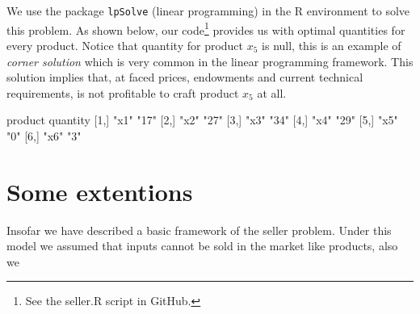 \documentclass[12pt]{article}         %
\begin{document}
We use the package \texttt{lpSolve} (linear programming) in the R environment to solve this problem. As shown below, our code\footnote{See the seller.R script in GitHub.} provides us with optimal quantities for every product. Notice that quantity for product $x_5$ is null, this is an example of \textit{corner solution} which is very common in the linear programming framework. This solution implies that, at faced prices, endowments and current technical requirements, is not profitable to craft product $x_5$ at all. 
\begin{Schunk}
\begin{Soutput}
     product quantity
[1,] "x1"    "17"    
[2,] "x2"    "27"    
[3,] "x3"    "34"    
[4,] "x4"    "29"    
[5,] "x5"    "0"     
[6,] "x6"    "3"     
\end{Soutput}
\end{Schunk}

\newpage

\section{Some extentions}
Insofar we have described a basic framework of the seller problem. Under this model we assumed that inputs cannot be sold in the market like products, also we 
\end{document}
